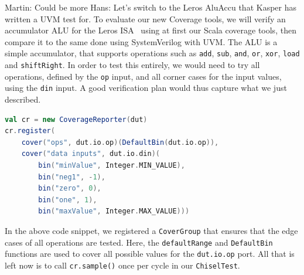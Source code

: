 \documentclass[conference]{IEEEtran}
\newcommand{\martin}[1]{{\color{blue} Martin: #1}}
\newcommand{\hjd}[1]{{\color{pink} Hans: #1}}
\begin{document}
\martin{Could be more} \hjd{Let's switch to the Leros AluAccu that Kasper has written a UVM test for.}
To evaluate our new Coverage tools, we will verify an accumulator ALU for the Leros ISA~\cite{leros:comp:2019} using at first our Scala coverage tools, then compare it to the same done using SystemVerilog with UVM.  
The ALU is a simple accumulator, that supports operations such as \texttt{add}, \texttt{sub}, \texttt{and}, \texttt{or}, \texttt{xor}, \texttt{load} and \texttt{shiftRight}.   
In order to test this entirely, we would need to try all operations, defined by the \texttt{op} input, and all corner cases for the input values, using the \texttt{din} input.  
A good verification plan would thus capture what we just described.  
\begin{lstlisting}[language=scala] 
val cr = new CoverageReporter(dut)  
cr.register(
	cover("ops", dut.io.op)(DefaultBin(dut.io.op)),
	cover("data inputs", dut.io.din)(
		bin("minValue", Integer.MIN_VALUE),
		bin("neg1", -1),
		bin("zero", 0),
		bin("one", 1),
		bin("maxValue", Integer.MAX_VALUE)))
\end{lstlisting}
In the above code snippet, we registered a \texttt{CoverGroup} that ensures that the edge cases of all operations are tested.
Here, the \texttt{defaultRange} and \texttt{DefaultBin} functions are used to cover all possible values for the \texttt{dut.io.op} port.
All that is left now is to call \texttt{cr.sample()} once per cycle in our \texttt{ChiselTest}.
\end{document}
